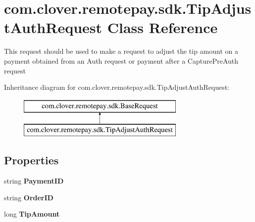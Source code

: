 \hypertarget{classcom_1_1clover_1_1remotepay_1_1sdk_1_1_tip_adjust_auth_request}{}\section{com.\+clover.\+remotepay.\+sdk.\+Tip\+Adjust\+Auth\+Request Class Reference}
\label{classcom_1_1clover_1_1remotepay_1_1sdk_1_1_tip_adjust_auth_request}


This request should be used to make a request to adjust the tip amount on a payment obtained from an Auth request or payment after a Capture\+Pre\+Auth request  


Inheritance diagram for com.\+clover.\+remotepay.\+sdk.\+Tip\+Adjust\+Auth\+Request\+:\begin{figure}[H]
\begin{center}
\leavevmode
\includegraphics[height=2.000000cm]{classcom_1_1clover_1_1remotepay_1_1sdk_1_1_tip_adjust_auth_request}
\end{center}
\end{figure}
\subsection*{Properties}
\begin{DoxyCompactItemize}
\item 
\mbox{\label{classcom_1_1clover_1_1remotepay_1_1sdk_1_1_tip_adjust_auth_request_aebec173605e51b5d928c70aa95890d39}} 
string {\bfseries Payment\+ID}
\item 
\mbox{\label{classcom_1_1clover_1_1remotepay_1_1sdk_1_1_tip_adjust_auth_request_abe79bc2f448d63b0c73dd299bb19f39d}} 
string {\bfseries Order\+ID}
\item 
\mbox{\label{classcom_1_1clover_1_1remotepay_1_1sdk_1_1_tip_adjust_auth_request_a60cffdb64e162244a72fe5adb7b6fddd}} 
long {\bfseries Tip\+Amount}
\end{DoxyCompactItemize}


